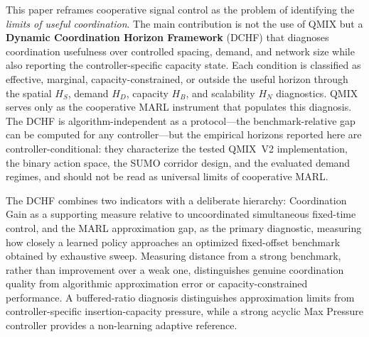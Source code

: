 \documentclass[review,12pt]{elsarticle}
\begin{document}
This paper reframes cooperative signal control as the problem of identifying the \textit{limits of useful coordination}. The main contribution is not the use of QMIX but a \textbf{Dynamic Coordination Horizon Framework} (DCHF) that diagnoses coordination usefulness over controlled spacing, demand, and network size while also reporting the controller-specific capacity state. Each condition is classified as effective, marginal, capacity-constrained, or outside the useful horizon through the spatial $H_S$, demand $H_D$, capacity $H_B$, and scalability $H_N$ diagnostics. QMIX serves only as the cooperative MARL instrument that populates this diagnosis. The DCHF is algorithm-independent as a protocol---the benchmark-relative gap can be computed for any controller---but the empirical horizons reported here are controller-conditional: they characterize the tested QMIX~V2 implementation, the binary action space, the SUMO corridor design, and the evaluated demand regimes, and should not be read as universal limits of cooperative MARL.

The DCHF combines two indicators with a deliberate hierarchy: Coordination Gain as a supporting measure relative to uncoordinated simultaneous fixed-time control, and the MARL approximation gap, as the primary diagnostic, measuring how closely a learned policy approaches an optimized fixed-offset benchmark obtained by exhaustive sweep. Measuring distance from a strong benchmark, rather than improvement over a weak one, distinguishes genuine coordination quality from algorithmic approximation error or capacity-constrained performance. A buffered-ratio diagnosis distinguishes approximation limits from controller-specific insertion-capacity pressure, while a strong acyclic Max Pressure controller provides a non-learning adaptive reference.
\end{document}
